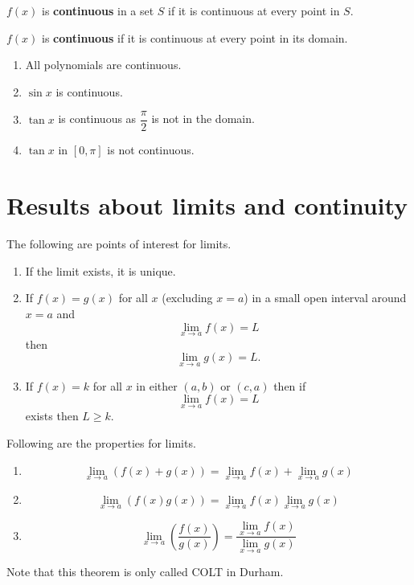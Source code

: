 \begin{definition}
    $f(x)$ is \textbf{continuous} in a set $S$ if it is continuous at every point in $S$. 
\end{definition}

\begin{definition}
    $f(x)$ is \textbf{continuous} if it is continuous at every point in its domain.
\end{definition}

\begin{example}
    \begin{enumerate}
        \item All polynomials are continuous.
        \item $\sin{x}$ is continuous.
        \item $\tan{x}$ is continuous as $\dfrac\pi2$ is not in the domain.
        \item $\tan{x}$ in $[0,\pi]$ is not continuous.
    \end{enumerate}
\end{example}

\section{Results about limits and continuity}

The following are points of interest for limits.

\begin{enumerate}
    \item If the limit exists, it is unique.
    \item If $f(x)=g(x)$ for all $x$ (excluding $x=a$) in a small open interval around $x=a$ and \[\lim_{x\to a}f(x)=L\] then \[\lim_{x\to a}g(x)=L.\]
    \item If $f(x)=k$ for all $x$ in either $(a,b)$ or $(c,a)$ then if \[\lim_{x\to a}f(x)=L\] exists then $L\geq k$.
\end{enumerate}

\begin{theorem}
    Following are the properties for limits.
    \begin{enumerate}
        \item \[\lim_{x\to a}(f(x)+g(x))=\lim_{x\to a}f(x)+\lim_{x\to a}g(x)\]
        \item \[\lim_{x\to a}(f(x)g(x))=\lim_{x\to a}f(x)\lim_{x\to a}g(x)\]
        \item \[\lim_{x\to a}\left(\dfrac{f(x)}{g(x)}\right)=\dfrac{\lim_{x\to a}f(x)}{\lim_{x\to a}g(x)}\]
    \end{enumerate}
    Note that this theorem is only called COLT in Durham.
\end{theorem}

